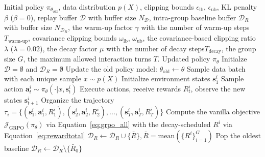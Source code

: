 \documentclass[]{youtu} %
\newcommand{\method}{\textsc{SPEAR}\xspace}
\begin{document}
\begin{algorithm}[htbp]
\caption{Training Agentic LLMs with \method}
\label{alg:sal}
\begin{algorithmic}[1]
\REQUIRE Initial policy $\pi_{\theta_{\text{old}}}$, data distribution $p(X)$, clipping bounds $\epsilon_{\text{lb}}$, $\epsilon_{\text{ub}}$, KL penalty $\beta$ ($\beta=0$), replay buffer $\mathcal{D}$ with buffer size $N_{\mathcal{D}}$, intra-group baseline buffer $\mathcal{D}_{R}$ with buffer size $N_{\mathcal{D}_{R}}$, the warm-up factor $\gamma$ with the number of warm-up steps $T_{\text{warm-up}}$, covariance clipping bounds $\omega_{\text{lb}}$, $\omega_{\text{ub}}$, the covariance-based clipping ratio $\lambda$ ($\lambda=0.02$), the decay factor $\mu$ with the number of decay steps$T_{\text{decay}}$, the group size $G$, the maximum allowed interaction turns $T$.
\ENSURE Updated policy $\pi_{\theta}$
\STATE Initialze $\mathcal{D}=\emptyset$ and $\mathcal{D}_{R}=\emptyset$
    \STATE Update the old policy model: $\theta_{\text{old}}\leftarrow\theta$
    \STATE {\color{darkgreen}{\# Repeat batch sampling and rollout generation for trajectories}}
    \STATE Sample data batch with each unique sample $x\sim p(X)$
        \STATE Initialize environment states $\mathbf{s}_{1}^{i}$
        \STATE {\color{darkgreen}{\# Sample at most $T$ actions}}
            \STATE Sample action $\mathbf{a}^{i}_{t}\sim\pi_{\theta}(\cdot|x,\mathbf{s}^{i}_{t})$
            \STATE Execute actions, receive rewards $R^{i}_{t}$, observe the new states $\mathbf{s}^{i}_{t+1}$
        \ENDFOR
        \STATE Organize the trajectory $\tau_{i}=\{(\mathbf{s}_1^{i}, \mathbf{a}_1^{i}, R_1^{i}), (\mathbf{s}_2^{i}, \mathbf{a}_2^{i}, R_2^{i}),...,(\mathbf{s}_{T}^{i}, \mathbf{a}_{T}^{i}, R_{T}^{i})\}$
    \ENDFOR
    \STATE {\color{darkgreen}{\# Apply intrinsic reward shaping for advantage estimation}}
    \STATE Compute the vanilla objective $ \mathcal{J}_{\text{GRPO}}(\pi_\theta)$ via Equation~\ref{eq:grpo_all} with the decay-scheduled $R^{i}$ via Equation~\ref{eq:rewardtotal}
    \STATE {\color{darkgreen}{\# Maintain the replay buffer and the baseline buffer}}
    \STATE $\mathcal{D}_{R}\leftarrow \mathcal{D}_{R}\cup \{\bar{R}\}, \bar{R}=\text{mean}(\{R^{i}\}_{i=1}^{G})$
        \STATE Pop the oldest baseline $\mathcal{D}_{R}\leftarrow \mathcal{D}_{R} \setminus \{ \bar{R}_0 \}$

\end{algorithmic}
\end{algorithm}
\end{document}
